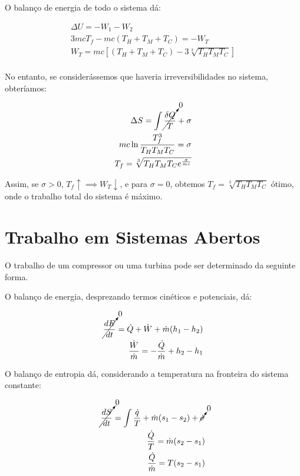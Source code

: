 \begin{examplebox}
O balanço de energia de todo o sistema dá:

\begin{eqnarray*}
    \Delta U = - W_1 - W_2 \\
    3 m c T_f - mc (T_H + T_M + T_C) = - W_T \\
    W_T =  mc \left[ (T_H + T_M + T_C) - 3 \sqrt[3]{T_H T_M T_C} \right] \\
\end{eqnarray*}

No entanto, se considerássemos que haveria irreversibilidades no sistema, obteríamos:

\begin{eqnarray*}
    \Delta S = \int \cancelto{0}{\frac{\delta Q}{T}} + \sigma \\
    m c \ln \frac{T_f^3}{T_H T_M T_C} = \sigma \\
    T_f = \sqrt[3]{T_H T_M T_C e^{\frac{\sigma}{m c}}}
\end{eqnarray*}

Assim, se $\sigma > 0$, $T_f \uparrow \implies W_T \downarrow$, e para $\sigma = 0$, obtemos $T_f = \sqrt[3]{T_H T_M T_C}$ ótimo, onde o trabalho total do sistema é máximo.

\end{examplebox}


\section{Trabalho em Sistemas Abertos}

O trabalho de um compressor ou uma turbina pode ser determinado da seguinte forma.

O balanço de energia, desprezando termos cinéticos e potenciais, dá:

\begin{eqnarray}
    \cancelto{0}{\frac{dE}{dt}} = \dot{Q} + \dot{W} + \dot{m} (h_1 - h_2) \\
    \frac{\dot{W}}{\dot{m}} = - \frac{\dot{Q}}{\dot{m}} + h_2 - h_1
\end{eqnarray}

O balanço de entropia dá, considerando a temperatura na fronteira do sistema constante:

\begin{eqnarray}
    \cancelto{0}{\frac{dS}{dt}} = \int \frac{\dot{q}}{T} + \dot{m} (s_1 - s_2) + \cancelto{0}{\dot{\sigma}}\\
    \frac{\dot{Q}}{T} = \dot{m} (s_2 - s_1) \\
    \frac{\dot{Q}}{\dot{m}} = T (s_2 - s_1)
\end{eqnarray}

